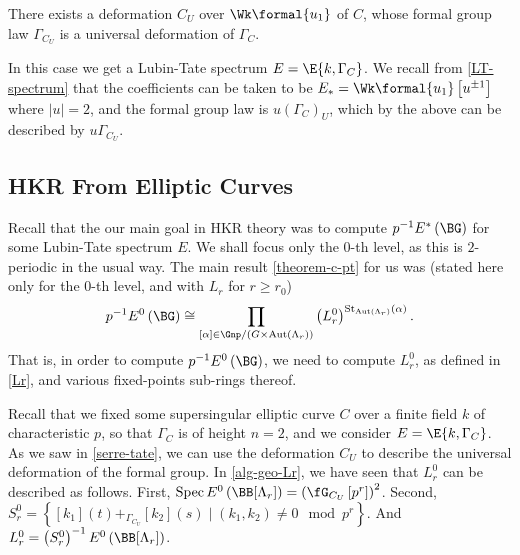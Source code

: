 \begin{theorem}\label{serre-tate}
	There exists a deformation $C_U$ over $\Wk\formal{u_1}$ of $C$, whose formal group law $\Gamma_{C_U}$ is a universal deformation of $\Gamma_C$.
\end{theorem}

In this case we get a Lubin-Tate spectrum $E = \E{k, \Gamma_C}$.
We recall from \ref{LT-spectrum} that the coefficients can be taken to be $E_* = \Wk\formal{u_1}\left[u^{\pm 1}\right]$ where $\left|u\right| = 2$, and the formal group law is $u\left(\Gamma_C\right)_U$, which by the above can be described by $u \Gamma_{C_U}$.



\subsection{HKR From Elliptic Curves}

Recall that the our main goal in HKR theory was to compute $p^{-1} E^*\left(\BG\right)$ for some Lubin-Tate spectrum $E$.
We shall focus only the $0$-th level, as this is $2$-periodic in the usual way.
The main result \ref{theorem-c-pt} for us was (stated here only for the $0$-th level, and with $L_r$ for $r \geq r_0$)
$$
p^{-1} E^0\left(\BG\right)
\cong \prod_{\left[\alpha\right] \in \Gnp/{\left(G \times \aut \left(\Lambda_r\right)\right)}}
\left(L_r^0\right)^{\stab_{\aut \left(\Lambda_r\right)}\left(\alpha\right)}.
$$
That is, in order to compute $p^{-1} E^0\left(\BG\right)$, we need to compute $L_r^0$, as defined in \ref{Lr}, and various fixed-points sub-rings thereof.

Recall that we fixed some supersingular elliptic curve $C$ over a finite field $k$ of characteristic $p$, so that $\Gamma_C$ is of height $n=2$, and we consider $E = \E{k, \Gamma_C}$.
As we saw in \ref{serre-tate}, we can use the deformation $C_U$ to describe the universal deformation of the formal group.
In \ref{alg-geo-Lr}, we have seen that $L_r^0$ can be described as follows.
First, $\spec E^0\left(\BB[\Lambda_r]\right) = \left(\fG_{C_U}\left[p^r\right]\right)^2$.
Second, $S_r^0 = \left\{ [k_1]\left(t\right) +_{\Gamma_{C_U}} [k_2]\left(s\right) \mid \left(k_1, k_2\right) \neq 0 \mod p^r\right\}$.
And $L_r^0 = \left(S_r^0\right)^{-1} E^0\left(\BB[\Lambda_r]\right)$.

